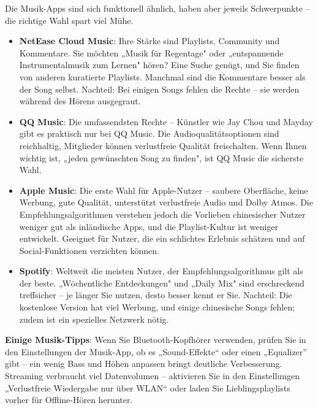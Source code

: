 


Die Musik-Apps sind sich funktionell ähnlich, haben aber jeweils Schwerpunkte – die richtige Wahl spart viel Mühe.

\begin{itemize}
  \item \textbf{NetEase Cloud Music}: Ihre Stärke sind Playlists, Community und Kommentare. Sie möchten „Musik für Regentage" oder „entspannende Instrumentalmusik zum Lernen" hören? Eine Suche genügt, und Sie finden von anderen kuratierte Playlists. Manchmal sind die Kommentare besser als der Song selbst. Nachteil: Bei einigen Songs fehlen die Rechte – sie werden während des Hörens ausgegraut.
  \item \textbf{QQ Music}: Die umfassendsten Rechte – Künstler wie Jay Chou und Mayday gibt es praktisch nur bei QQ Music. Die Audioqualitätsoptionen sind reichhaltig, Mitglieder können verlustfreie Qualität freischalten. Wenn Ihnen wichtig ist, „jeden gewünschten Song zu finden", ist QQ Music die sicherste Wahl.
  \item \textbf{Apple Music}: Die erste Wahl für Apple-Nutzer – saubere Oberfläche, keine Werbung, gute Qualität, unterstützt verlustfreie Audio und Dolby Atmos. Die Empfehlungsalgorithmen verstehen jedoch die Vorlieben chinesischer Nutzer weniger gut als inländische Apps, und die Playlist-Kultur ist weniger entwickelt. Geeignet für Nutzer, die ein schlichtes Erlebnis schätzen und auf Social-Funktionen verzichten können.
  \item \textbf{Spotify}: Weltweit die meisten Nutzer, der Empfehlungsalgorithmus gilt als der beste. „Wöchentliche Entdeckungen" und „Daily Mix" sind erschreckend treffsicher – je länger Sie nutzen, desto besser kennt er Sie. Nachteil: Die kostenlose Version hat viel Werbung, und einige chinesische Songs fehlen; zudem ist ein spezielles Netzwerk nötig.
\end{itemize}

\textbf{Einige Musik-Tipps}: Wenn Sie Bluetooth-Kopfhörer verwenden, prüfen Sie in den Einstellungen der Musik-App, ob es „Sound-Effekte“ oder einen „Equalizer” gibt – ein wenig Bass und Höhen anpassen bringt deutliche Verbesserung. Streaming verbraucht viel Datenvolumen – aktivieren Sie in den Einstellungen „Verlustfreie Wiedergabe nur über WLAN“ oder laden Sie Lieblingsplaylists vorher für Offline-Hören herunter.

